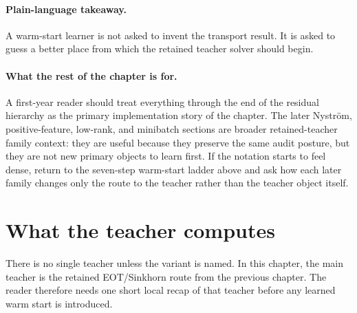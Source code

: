 \paragraph{Plain-language takeaway.}
A warm-start learner is not asked to invent the transport result.  It is asked
to guess a better place from which the retained teacher solver should begin.

\paragraph{What the rest of the chapter is for.}
A first-year reader should treat everything through the end of the residual
hierarchy as the primary implementation story of the chapter.  The later Nystr{\"o}m,
positive-feature, low-rank, and minibatch sections are broader retained-teacher
family context: they are useful because they preserve the same audit posture, but
they are not new primary objects to learn first.  If the notation starts to feel
dense, return to the seven-step warm-start ladder above and ask how each later
family changes only the route to the teacher rather than the teacher object itself.

\section{What the teacher computes}
\label{sec:bf-learned-ot-hierarchy}

There is no single teacher unless the variant is named.  In this chapter, the
main teacher is the retained EOT/Sinkhorn route from the previous chapter.  The
reader therefore needs one short local recap of that teacher before any learned
warm start is introduced.

